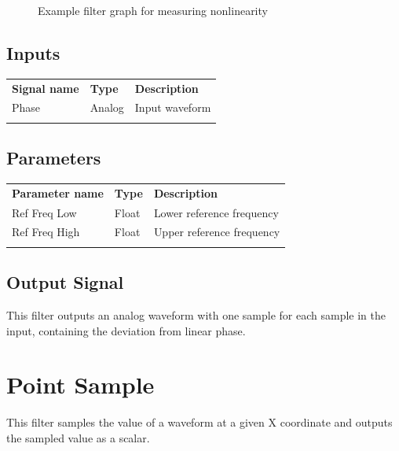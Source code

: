 \begin{figure}[h]
\centering
{}
\caption{Example filter graph for measuring nonlinearity}
\label{phase_nonlinearity_graph}
\end{figure}

\FloatBarrier

\subsection{Inputs}

\begin{tabularx}{16cm}{llX}
\thickhline
\textbf{Signal name} & \textbf{Type} & \textbf{Description} \\
\thickhline
Phase & Analog & Input waveform \\
\thickhline
\end{tabularx}

\subsection{Parameters}

\begin{tabularx}{16cm}{llX}
\thickhline
\textbf{Parameter name} & \textbf{Type} & \textbf{Description} \\
\thickhline
Ref Freq Low & Float & Lower reference frequency\\
\thinhline
Ref Freq High & Float & Upper reference frequency\\
\thickhline
\end{tabularx}

\subsection{Output Signal}

This filter outputs an analog waveform with one sample for each sample in the input, containing the deviation from
linear phase.

\pagebreak
\section{Point Sample}
\label{filter:pointsample}

This filter samples the value of a waveform at a given X coordinate and outputs the sampled value as a scalar.

